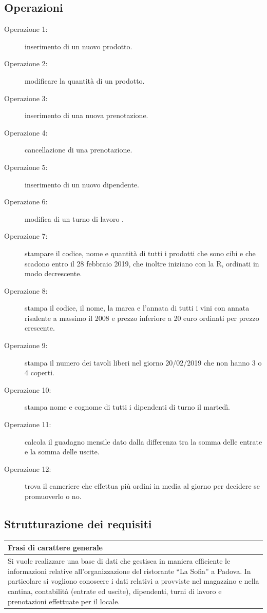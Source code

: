 \subsection{Operazioni}
\begin{description}
    \item [Operazione 1:] inserimento di un nuovo prodotto.
    \item [Operazione 2:] modificare la quantità di un prodotto.
    \item [Operazione 3:] inserimento di una nuova prenotazione.
    \item [Operazione 4:] cancellazione di una prenotazione.
    \item [Operazione 5:] inserimento di un nuovo dipendente.
    \item [Operazione 6:] modifica di un turno di lavoro .
    \item [Operazione 7:] stampare il codice, nome e quantità di tutti i prodotti che sono cibi e che scadono entro il 28 febbraio 2019, che inoltre iniziano con la R, ordinati in modo decrescente.
    \item [Operazione 8:] stampa il codice, il nome, la marca e l’annata di tutti i vini con annata risalente a massimo il 2008 e prezzo inferiore a 20 euro ordinati per prezzo crescente.
    \item [Operazione 9:] stampa il numero dei tavoli liberi nel giorno 20/02/2019 che non hanno 3 o 4 coperti.
    \item [Operazione 10:] stampa nome e cognome di tutti i dipendenti di turno il martedì.
    \item [Operazione 11:] calcola il guadagno mensile dato dalla differenza tra la somma delle entrate e la somma delle uscite.
    \item [Operazione 12:] trova il cameriere che effettua più ordini in media al giorno per decidere se promuoverlo o no.
\end{description}

\subsection{Strutturazione dei requisiti} 
\begin{longtable}{|p{17cm}|}
    \hline
    \textbf{Frasi di carattere generale} \\ \hline
    Si vuole realizzare una base di dati che gestisca in maniera efficiente le informazioni relative all’organizzazione del ristorante “La Sofia” a Padova. In particolare si vogliono conoscere i dati relativi a provviste nel magazzino e nella cantina, contabilità (entrate ed uscite), dipendenti, turni di lavoro e prenotazioni effettuate per il locale. \\ \hline
\end{longtable}

